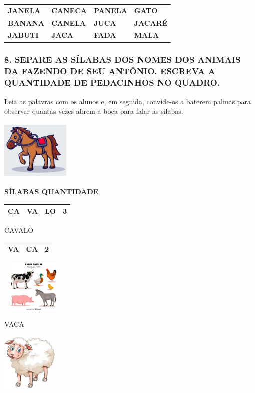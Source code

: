 \begin{longtable}[]{@{}llll@{}}
\toprule
\textbf{JANELA} & \textbf{CANECA} & \textbf{PANELA} &
\textbf{GATO}\tabularnewline
\textbf{BANANA} & \textbf{CANELA} & \textbf{JUCA} &
\textbf{JACARÉ}\tabularnewline
\textbf{JABUTI} & \textbf{JACA} & \textbf{FADA} &
\textbf{MALA}\tabularnewline
\bottomrule
\end{longtable}

\subsubsection{8. SEPARE AS SÍLABAS DOS NOMES DOS ANIMAIS
DA FAZENDO DE SEU ANTÔNIO. ESCREVA A QUANTIDADE DE PEDACINHOS NO
QUADRO.}\label{separe-as-suxedlabas-das-palavras-dos-nomes-dos-animais-da-fazendo-de-seu-antuxf4nio.-e-escreva-a-quantidade-de-pedacinho-no-quadro.}

Leia as palavras com os alunos e, em seguida, convide-os a baterem
palmas para observar quantas vezes abrem a boca para falar as sílabas.


\includegraphics[width=1.29126in,height=1.13542in]{media/image26.jpg}

\textbf{SÍLABAS QUANTIDADE}

\begin{longtable}[]{@{}llll@{}}
\toprule
CA & VA & LO & 3\tabularnewline
\bottomrule
\end{longtable}

CAVALO

\begin{longtable}[]{@{}lll@{}}
\toprule
VA & CA & 2\tabularnewline
\bottomrule
\end{longtable}

\includegraphics[width=1.19577in,height=0.98873in]{media/image27.jpg}

VACA

\includegraphics[width=1.06250in,height=1.09969in]{media/image28.jpg}

